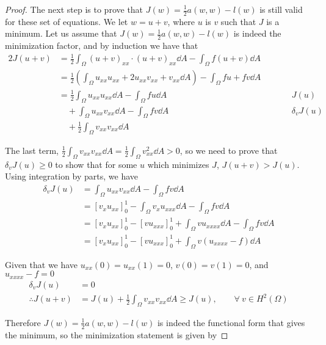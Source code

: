 \begin{enumerate}[label=(\alph*),leftmargin=*,itemsep=0mm]
\begin{proof}
    The next step is to prove that $J(w) = \frac{1}{2}a(w,w) - l(w)$ is still valid for these set of equations.  We let $w = u + v$, where $u$ is $v$ such that $J$ is a minimum.  Let us assume that $J(w) = \frac{1}{2}a(w,w) - l(w)$ is indeed the minimization factor, and by induction we have that
    \begin{alignat}{2}
        J(u+v) &= \frac{1}{2}\int_\Omega (u+v)_{xx} \cdot (u+v)_{xx} \dd{A} - \int_\Omega f (u+v) \dd{A} \nonumber \\
        &= \frac{1}{2} \left( \int_\Omega u_{xx}u_{xx} + 2u_{xx}v_{xx} + v_{xx} \dd{A} \right)
        - \int_\Omega fu + fv \dd{A} \nonumber \\
        &= \frac{1}{2} \int_\Omega u_{xx}u_{xx} \dd{A} - \int_\Omega fu \dd{A} &&\qquad J(u) \nonumber \\
        &\quad + \int_\Omega u_{xx}v_{xx} \dd{A} - \int_\Omega fv \dd{A} &&\qquad \delta_vJ(u) \nonumber \\
        &\quad + \frac{1}{2}\int_\Omega v_{xx}v_{xx} \dd{A}
    \end{alignat}
    
    The last term, $\frac{1}{2}\int_\Omega v_{xx}v_{xx} \dd{A} = \frac{1}{2}\int_\Omega v_{xx}^2 \dd{A} > 0$, so we need to prove that $\delta_vJ(u) \geq 0$ to show that for some $u$ which minimizes $J$, $J(u+v) > J(u)$.  Using integration by parts, we have
    \begin{align*}
        \delta_vJ(u) &= \int_\Omega u_{xx}v_{xx} \dd{A} - \int_\Omega fv \dd{A} \\
        &= [v_xu_{xx}]_0^1 - \int_\Omega v_xu_{xxx} \dd{A} - \int_\Omega fv \dd{A} \\
        &= [v_xu_{xx}]_0^1 - [vu_{xxx}]_0^1 + \int_\Omega vu_{xxxx} \dd{A} - \int_\Omega fv \dd{A} \\
        &= [v_xu_{xx}]_0^1 - [vu_{xxx}]_0^1 + \int_\Omega v (u_{xxxx}-f) \dd{A}
    \end{align*}
    
    Given that we have $u_{xx}(0) = u_{xx}(1) = 0$, $v(0) = v(1) = 0$, and $u_{xxxx} - f = 0$
    \begin{align*}
        \delta_vJ(u) &= 0 \\
        \therefore J(u+v) &= J(u) + \frac{1}{2}\int_\Omega v_{xx}v_{xx} \dd{A} \geq J(u), \qquad
        \forall \> v \in H^2(\Omega)
    \end{align*}
    
    Therefore $J(w) = \frac{1}{2}a(w,w) - l(w)$ is indeed the functional form that gives the minimum, so the minimization statement is given by
    

\end{proof}
\end{enumerate}
